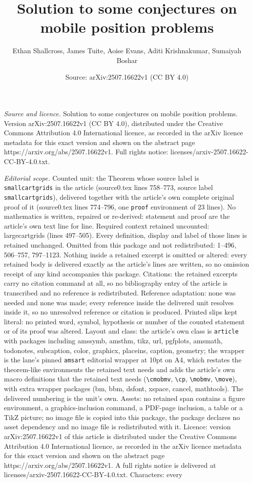 \documentclass[10pt,a4paper]{amsart}
\title[Solution to some conjectures on mobile position problems]{Solution to some conjectures on mobile position problems}
\author{Ethan Shallcross, James Tuite, Aoise Evans, Aditi Krishnakumar, Sumaiyah Boshar}
\date{Source: arXiv:2507.16622v1 (CC BY 4.0)}
\begin{document}
\maketitle

\noindent\emph{Source and licence.} Solution to some conjectures on mobile position problems. Version arXiv:2507.16622v1 (CC BY 4.0), distributed under the Creative Commons Attribution 4.0 International licence, as recorded in the arXiv licence metadata for this exact version and shown on the abstract page https://arxiv.org/abs/2507.16622v1. Full rights notice: licenses/arxiv-2507.16622-CC-BY-4.0.txt.\par\smallskip

\noindent\textit{Editorial scope.} Counted unit: the Theorem whose source label is \texttt{smallcartgrids} in the article (source0.tex lines 758--773, source label \texttt{smallcartgrids}), delivered together with the article's own complete original proof of it (source0.tex lines 774--796, one \texttt{proof} environment of 23 lines). No mathematics is written, repaired or re-derived: statement and proof are the article's own text line for line. Required context retained uncounted: largecartgrids (lines 497--505). Every definition, display and label of those lines is retained unchanged. Omitted from this package and not redistributed: 1--496, 506--757, 797--1123. Nothing inside a retained excerpt is omitted or altered: every retained body is delivered exactly as the article's lines are written, so no omission receipt of any kind accompanies this package. Citations: the retained excerpts carry no citation command at all, so no bibliography entry of the article is transcribed and no reference is redistributed. Reference adaptation: none was needed and none was made; every reference inside the delivered unit resolves inside it, so no unresolved reference or citation is produced. Printed slips kept literal: no printed word, symbol, hypothesis or number of the counted statement or of its proof was altered. Layout and class: the article's own class is \texttt{article} with packages including amssymb, amsthm, tikz, url, pgfplots, amsmath, todonotes, subcaption, color, graphicx, placeins, caption, geometry; the wrapper is the lane's pinned \texttt{amsart} editorial wrapper at 10pt on A4, which restates the theorem-like environments the retained text needs and adds the article's own macro definitions that the retained text needs (\texttt{\textbackslash cmobmv}, \texttt{\textbackslash cp}, \texttt{\textbackslash mobmv}, \texttt{\textbackslash move}), with extra wrapper packages (bm, bbm, dsfont, xspace, cancel, mathtools). The delivered numbering is the unit's own. Assets: no retained span contains a figure environment, a graphics-inclusion command, a PDF-page inclusion, a table or a TikZ picture; no image file is copied into this package, the package declares no asset dependency and no image file is redistributed with it. Licence: version arXiv:2507.16622v1 of this article is distributed under the Creative Commons Attribution 4.0 International licence, as recorded in the arXiv licence metadata for this exact version and shown on the abstract page https://arxiv.org/abs/2507.16622v1. A full rights notice is delivered at licenses/arxiv-2507.16622-CC-BY-4.0.txt. Characters: every 
\end{document}
